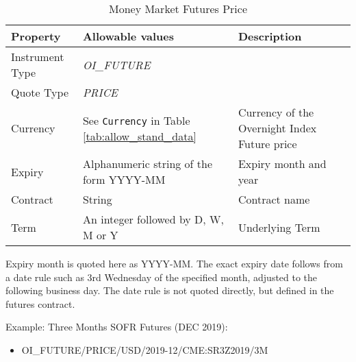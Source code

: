 \begin{table}[H]
\centering
  \begin{tabular}{|p{3cm}|p{4.5cm}|p{7cm}|}
  \hline
    {\bf Property} & {\bf Allowable values} & {\bf Description} \\ \hline
    Instrument Type & \emph{OI\_FUTURE} & \\ \hline
    Quote Type & \emph{PRICE} & \\ \hline
    Currency & See \lstinline!Currency! in Table \ref{tab:allow_stand_data}& Currency of the Overnight Index Future price\\ \hline
    Expiry & Alphanumeric string of the form YYYY-MM & Expiry month and year\\ \hline
    Contract & String & Contract name\\ \hline
    Term & An integer followed by D, W, M or Y & Underlying Term\\ \hline
  \end{tabular}
  \caption{Money Market Futures Price}
  \label{tab:mmfp_quote}
\end{table}

Expiry month is quoted here as YYYY-MM. The exact expiry date follows from a date rule such as 3rd
Wednesday of the specified month, adjusted to the following business day. The date rule is not quoted directly, but
defined in the futures contract.

\medskip
Example: Three Months SOFR Futures (DEC 2019):
\begin{itemize}
\item {OI\_FUTURE/PRICE/USD/2019-12/CME:SR3Z2019/3M}
\end{itemize}

